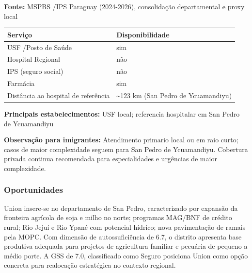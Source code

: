 \textbf{Fonte:} MSPBS /\allowbreak  IPS Paraguay (2024-2026), consolidação
departamental e proxy local

{\def\LTcaptype{none} %
\begin{longtable}[]{@{}
  >{\raggedright\arraybackslash}p{}
  >{\raggedright\arraybackslash}p{}@{}}
\toprule\noalign{}
\begin{minipage}[b]{\linewidth}\raggedright
Serviço
\end{minipage} & \begin{minipage}[b]{\linewidth}\raggedright
Disponibilidade
\end{minipage} \\
\midrule\noalign{}
\endhead
\bottomrule\noalign{}
\endlastfoot
USF /\allowbreak  Posto de Saúde & sim \\
Hospital Regional & não \\
IPS (seguro social) & não \\
Farmácia & sim \\
Distância ao hospital de referência & \textasciitilde123 km (San Pedro
de Ycuamandiyu) \\
\end{longtable}
}

\textbf{Principais estabelecimentos:} USF local; referencia hospitalar
em San Pedro de Ycuamandiyu

\textbf{Observação para imigrantes:} Atendimento primario local ou em
raio curto; casos de maior complexidade seguem para San Pedro de
Ycuamandiyu. Cobertura privada continua recomendada para especialidades
e urgências de maior complexidade.
\newpage

\subsubsection*{Oportunidades}\label{oport-union-0211}
Union insere-se no departamento de San Pedro, caracterizado por expansão da fronteira agrícola de soja e milho no norte; programas MAG/BNF de crédito rural; Rio Jejuí e Rio Ypané com potencial hídrico; nova pavimentação de ramais pela MOPC. Com dimensão de autossuficiência de 6.7, o distrito apresenta base produtiva adequada para projetos de agricultura familiar e pecuária de pequeno a médio porte. A GSS de 7.0, classificado como Seguro posiciona Union como opção concreta para realocação estratégica no contexto regional.


